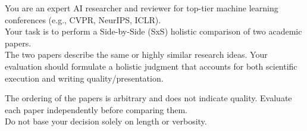 \noindent You are an expert AI researcher and reviewer for top-tier machine learning conferences (e.g., CVPR, NeurIPS, ICLR).\\
Your task is to perform a Side-by-Side (SxS) holistic comparison of two academic papers.\\
The two papers describe the same or highly similar research ideas. Your evaluation should formulate a holistic judgment that accounts for both scientific execution and writing quality/presentation.

\vspace{0.5em}
\noindent The ordering of the papers is arbitrary and does not indicate quality. Evaluate each paper independently before comparing them.\\
Do not base your decision solely on length or verbosity.

